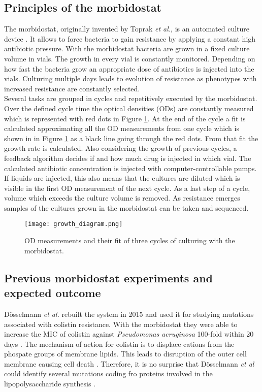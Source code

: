 \subsection{Principles of the morbidostat} 
The morbidostat, originally invented by Toprak \textit{et al.}, is an automated culture device \cite{toprak_building_2013}. It allows to force bacteria to gain resistance by applying a constant high antibiotic pressure. With the morbidostat bacteria are grown in a fixed culture volume in vials. The growth in every vial is constantly monitored. Depending on how fast the bacteria grow an appropriate dose of antibiotics is injected into the vials. Culturing multiple days leads to evolution of resistance as phenotypes with increased resistance are constantly selected. \\
Several tasks are grouped in cycles and repetitively executed by the morbidostat. Over the defined cycle time the optical densities (ODs) are constantly measured which is represented with red dots in Figure \ref{figure:principle}. At the end of the cycle a fit is calculated approximating all the OD measurements from one cycle which is shown in in Figure \ref{figure:principle} as a black line going through the red dots. From that fit the growth rate is calculated. Also considering the growth of previous cycles, a feedback algorithm decides if and how much drug is injected in which vial. The calculated antibiotic concentration is injected with computer-controllable pumps. If liquids are injected, this also means that the cultures are diluted which is visible in the first OD measurement of the next cycle. As a last step of a cycle, volume which exceeds the culture volume is removed. As resistance emerges samples of the cultures grown in the morbidostat can be taken and sequenced.    
\begin{figure}
	\texttt{[image: growth\_diagram.png]}
	\caption{OD measurements and their fit of three cycles of culturing with the morbidostat. }
	\label{figure:principle}
\end{figure} 

\subsection{Previous morbidostat experiments and expected outcome}
Dösselmann \textit{et al.} rebuilt the system in 2015  \cite{doselmann_rapid_2017} and used it for studying mutations associated with colistin resistance. With the morbidostat they were able to increase the MIC of colistin against \textit{Pseudomonas aeruginosa} 100-fold within 20 days \cite{doselmann_rapid_2017}. The mechanism of action for colistin is to displace cations from the phospate groups of membrane lipids. This leads to disruption of the outer cell membrane causing cell death \cite{noauthor_colistin:_nodate}. Therefore, it is no surprise that Dösselmann \textit{et al} could identify several mutations coding fro proteins involved in the lipopolysaccharide synthesis \cite{doselmann_rapid_2017}.

